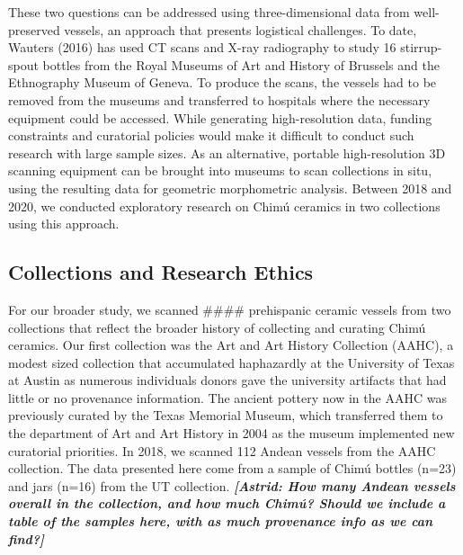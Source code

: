 \documentclass[]{interact}
\theoremstyle{plain}%
\theoremstyle{definition}
\theoremstyle{remark}
\begin{document}
These two questions can be addressed using three-dimensional data from
well-preserved vessels, an approach that presents logistical challenges.
To date, Wauters (2016) has used CT scans and X-ray radiography to study
16 stirrup-spout bottles from the Royal Museums of Art and History of
Brussels and the Ethnography Museum of Geneva. To produce the scans, the
vessels had to be removed from the museums and transferred to hospitals
where the necessary equipment could be accessed. While generating
high-resolution data, funding constraints and curatorial policies would
make it difficult to conduct such research with large sample sizes. As
an alternative, portable high-resolution 3D scanning equipment can be
brought into museums to scan collections in situ, using the resulting
data for geometric morphometric analysis. Between 2018 and 2020, we
conducted exploratory research on Chimú ceramics in two collections
using this approach.

\hypertarget{collections-and-research-ethics}{%
\subsection{Collections and Research
Ethics}\label{collections-and-research-ethics}}

For our broader study, we scanned \#\#\#\# prehispanic ceramic vessels
from two collections that reflect the broader history of collecting and
curating Chimú ceramics. Our first collection was the Art and Art
History Collection (AAHC), a modest sized collection that accumulated
haphazardly at the University of Texas at Austin as numerous individuals
donors gave the university artifacts that had little or no provenance
information. The ancient pottery now in the AAHC was previously curated
by the Texas Memorial Museum, which transferred them to the department
of Art and Art History in 2004 as the museum implemented new curatorial
priorities. In 2018, we scanned 112 Andean vessels from the AAHC
collection. The data presented here come from a sample of Chimú bottles
(n=23) and jars (n=16) from the UT collection. \emph{\textbf{{[}Astrid:
How many Andean vessels overall in the collection, and how much Chimú?
Should we include a table of the samples here, with as much provenance
info as we can find?{]}}}
\end{document}
